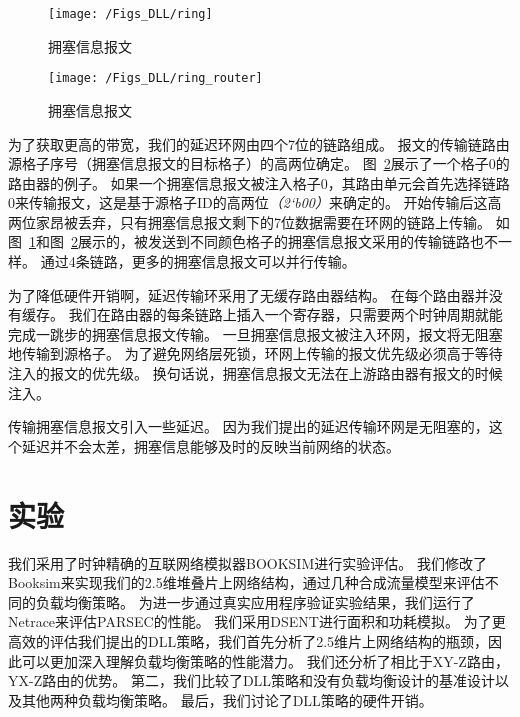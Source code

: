 \begin{figure}[htbp] %
  \centering
  \texttt{[image: /Figs\_DLL/ring]}
  \caption{拥塞信息报文}
  \label{fig:ring}
\end{figure}

\begin{figure}[htbp] %
  \centering
  \texttt{[image: /Figs\_DLL/ring\_router]}
  \caption{拥塞信息报文}
  \label{fig:ring_router}
\end{figure}

为了获取更高的带宽，我们的延迟环网由四个7位的链路组成。
报文的传输链路由源格子序号（拥塞信息报文的目标格子）的高两位确定。
图~\ref{fig:ring_router}展示了一个格子0的路由器的例子。
如果一个拥塞信息报文被注入格子0，其路由单元会首先选择链路0来传输报文，这是基于源格子ID的高两位\emph{（2‘b00）}来确定的。
开始传输后这高两位家昂被丢弃，只有拥塞信息报文剩下的7位数据需要在环网的链路上传输。
如图~\ref{fig:ring}和图~\ref{fig:ring_router}展示的，被发送到不同颜色格子的拥塞信息报文采用的传输链路也不一样。
通过4条链路，更多的拥塞信息报文可以并行传输。

为了降低硬件开销啊，延迟传输环采用了无缓存路由器结构。
在每个路由器并没有缓存。
我们在路由器的每条链路上插入一个寄存器，只需要两个时钟周期就能完成一跳步的拥塞信息报文传输。
一旦拥塞信息报文被注入环网，报文将无阻塞地传输到源格子。
为了避免网络层死锁，环网上传输的报文优先级必须高于等待注入的报文的优先级。
换句话说，拥塞信息报文无法在上游路由器有报文的时候注入。

传输拥塞信息报文引入一些延迟。
因为我们提出的延迟传输环网是无阻塞的，这个延迟并不会太差，拥塞信息能够及时的反映当前网络的状态。



\section{实验}

我们采用了时钟精确的互联网络模拟器BOOKSIM进行实验评估。
我们修改了Booksim来实现我们的2.5维堆叠片上网络结构，通过几种合成流量模型来评估不同的负载均衡策略。
为进一步通过真实应用程序验证实验结果，我们运行了Netrace来评估PARSEC的性能。
我们采用DSENT进行面积和功耗模拟。
为了更高效的评估我们提出的DLL策略，我们首先分析了2.5维片上网络结构的瓶颈，因此可以更加深入理解负载均衡策略的性能潜力。
我们还分析了相比于XY-Z路由，YX-Z路由的优势。
第二，我们比较了DLL策略和没有负载均衡设计的基准设计以及其他两种负载均衡策略。
最后，我们讨论了DLL策略的硬件开销。

